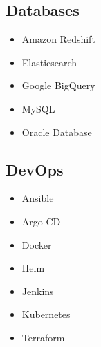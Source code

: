 \documentclass[letterpaper]{resume}
\begin{document}
\begin{minipage}[t]{0.27\columnwidth}
\sectionspace

\subsection{Databases}
\begin{itemize}
\item Amazon Redshift
\item Elasticsearch
\item Google BigQuery
\item MySQL
\item Oracle Database
\end{itemize}

\sectionspace

\subsection{DevOps}
\begin{itemize}
\item Ansible
\item Argo CD
\item Docker
\item Helm
\item Jenkins
\item Kubernetes
\item Terraform
\end{itemize}

\sectionspace

\end{minipage}
\hfill
\end{document}
